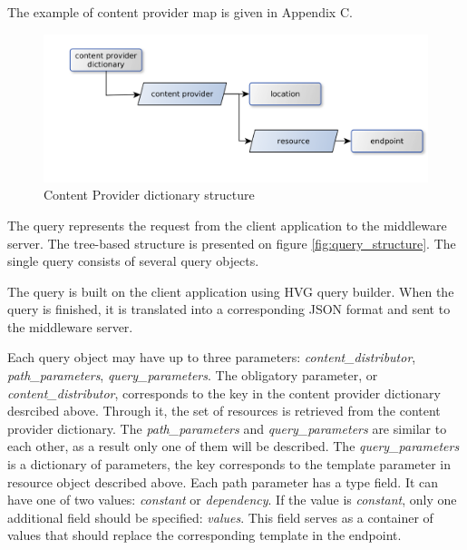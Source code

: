 The example of content provider map is given in Appendix C.


\begin{figure}[h]
    \centering
	\includegraphics[width=\textwidth]{images/content_provider_map.png}
    \caption{Content Provider dictionary structure}
    \label{fig:content_provider_map}
\end{figure}


The query represents the request from the client application to the middleware server. The tree-based structure is presented on figure \ref{fig:query_structure}. The single query consists of several query objects.

The query is built on the client application using HVG query builder. When the query is finished, it is translated into a corresponding JSON format and sent to the middleware server.

Each query object may have up to three parameters: \textit{content\_distributor}, \textit{path\_parameters}, \textit{query\_parameters}. The obligatory parameter, or \textit{content\_distributor}, corresponds to the key in the content provider dictionary desrcibed above. Through it, the set of resources is retrieved from the content provider dictionary. The \textit{path\_parameters} and \textit{query\_parameters} are similar to each other, as a result only one of them will be described. The \textit{query\_parameters} is a dictionary of parameters, the key corresponds to the template parameter in resource object described above. Each path parameter has a type field. It can have one of two values: \textit{constant} or \textit{dependency}. If the value is \textit{constant}, only one additional field should be specified: \textit{values}. This field serves as a container of values that should replace the corresponding template in the endpoint. 


